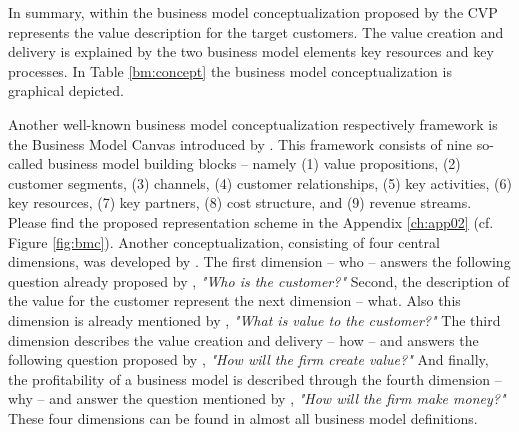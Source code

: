 In summary, within the business model conceptualization proposed by \citet[p. 54]{Johnson2008} the \ac{CVP} represents the value description for the target customers. The value creation and delivery is explained by the two business model elements key resources and key processes. In Table \ref{bm:concept} the business model conceptualization is graphical depicted.

Another well-known business model conceptualization respectively framework is the Business Model Canvas  introduced by \citet{Osterwalder2010}. This framework consists of nine so-called business model building blocks -- namely (1) value propositions, (2) customer segments, (3) channels, (4) customer relationships, (5) key activities, (6) key resources, (7) key partners, (8) cost structure, and (9) revenue streams. Please find the proposed representation scheme in the Appendix \ref{ch:app02} (cf. Figure \ref{fig:bmc}). Another conceptualization, consisting of four central dimensions, was developed by \citet{Frankenberger2013}. The first dimension -- who -- answers the following question already proposed by \citet[pp. 49-61]{Drucker1954}, \textit{"Who is the customer?"} Second, the description of the value for the customer represent the next dimension -- what. Also this dimension is already mentioned by \citet[pp. 49-61]{Drucker1954}, \textit{"What is value to the customer?"} The third dimension describes the value creation and delivery -- how -- and answers the following question proposed by \citet[pp. 729-732]{Morris2005}, \textit{"How will the firm create value?"} And finally, the profitability of a business model is described through the fourth dimension -- why -- and answer the question mentioned by \citet[pp. 729-732]{Morris2005}, \textit{"How will the firm make money?"} These four dimensions can be found in almost all business model definitions.

